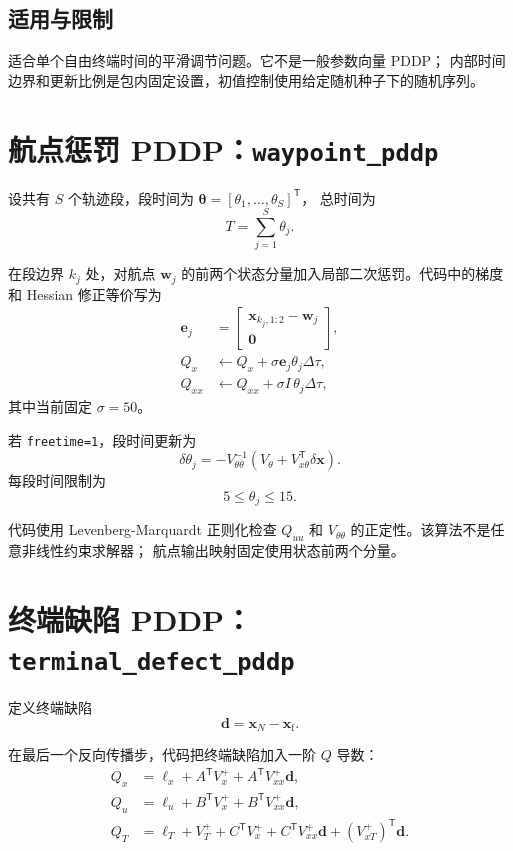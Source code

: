 \documentclass[UTF8,zihao=-4,openany,fontset=fandol]{ctexbook}
\newcommand{\code}[1]{\nolinkurl{#1}}
\begin{document}
\subsection{适用与限制}

适合单个自由终端时间的平滑调节问题。它不是一般参数向量 PDDP；
内部时间边界和更新比例是包内固定设置，初值控制使用给定随机种子下的随机序列。

\section{航点惩罚 PDDP：\texorpdfstring{\texttt{waypoint\_pddp}}{waypoint-pddp}}

设共有 $S$ 个轨迹段，段时间为
$\bm{\theta}=[\theta_1,\ldots,\theta_S]^\mathsf{T}$，
总时间为
\[
  T=\sum_{j=1}^{S}\theta_j.
\]

在段边界 $k_j$ 处，对航点 $\bm{w}_j$ 的前两个状态分量加入局部二次惩罚。代码中的梯度和 Hessian 修正等价写为
\begin{align}
  \bm{e}_j&=
  \begin{bmatrix}
  \bm{x}_{k_j,1:2}-\bm{w}_j\\
  \bm{0}
  \end{bmatrix},\\
  Q_x&\leftarrow Q_x+\sigma\bm{e}_j\theta_j\Delta\tau,\\
  Q_{xx}&\leftarrow Q_{xx}+
  \sigma I\,\theta_j\Delta\tau,
\end{align}
其中当前固定 $\sigma=50$。

若 \code{freetime=1}，段时间更新为
\begin{equation}
  \delta\theta_j
  =
  -V_{\theta\theta}^{-1}
  \left(
  V_\theta+V_{x\theta}^\mathsf{T}\delta\bm{x}
  \right).
\end{equation}
每段时间限制为
\[
  5\le\theta_j\le 15.
\]

代码使用 Levenberg-Marquardt 正则化检查 $Q_{uu}$ 和
$V_{\theta\theta}$ 的正定性。该算法不是任意非线性约束求解器；
航点输出映射固定使用状态前两个分量。

\section{终端缺陷 PDDP：\texorpdfstring{\texttt{terminal\_defect\_pddp}}{terminal-defect-pddp}}

定义终端缺陷
\begin{equation}
  \bm{d}=\bm{x}_N-\bm{x}_{\mathrm f}.
\end{equation}

在最后一个反向传播步，代码把终端缺陷加入一阶 $Q$ 导数：
\begin{align}
  Q_x&=
  \ell_x+A^\mathsf{T}V_x^+
  +A^\mathsf{T}V_{xx}^+\bm{d},\\
  Q_u&=
  \ell_u+B^\mathsf{T}V_x^+
  +B^\mathsf{T}V_{xx}^+\bm{d},\\
  Q_T&=
  \ell_T+V_T^++C^\mathsf{T}V_x^+
  +C^\mathsf{T}V_{xx}^+\bm{d}
  +(V_{xT}^+)^\mathsf{T}\bm{d}.
\end{align}
\end{document}
